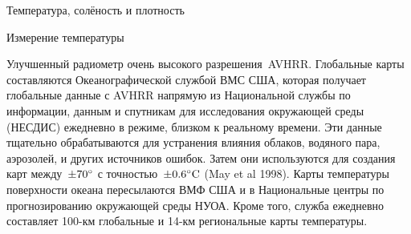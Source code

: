 \begin{chapter}{Температура, солёность и плотность}
\begin{section}{Измерение температуры}
\begin{paragraph}{Улучшенный радиометр очень высокого разрешения~AVHRR.}
Глобальные карты составляются Океанографической службой ВМС США, которая
получает глобальные данные с AVHRR напрямую из Национальной службы 
по информации, данным и спутникам для исследования окружающей среды (НЕСДИС)
ежедневно в режиме, близком к реальному времени. Эти данные тщательно
обрабатываются для устранения влияния облаков, водяного пара,
аэрозолей, и других источников ошибок. Затем они используются для
создания карт между~$\pm{70}^\circ$ с точностью~$\pm{0.6}^\circ\mbox{C}$
(May et al 1998). Карты температуры поверхности океана пересылаются ВМФ США
и в Национальные центры по прогнозированию окружающей среды НУОА.
Кроме того, служба ежедневно составляет 100-км
глобальные и 14-км региональные карты температуры.
%
\end{paragraph}


\end{section}
\end{chapter}
